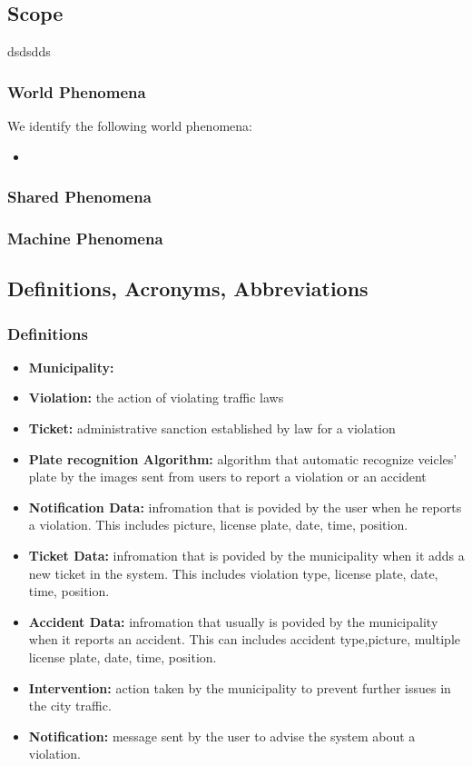 \documentclass {article}
\begin{document}
	\subsection{Scope}
	dsdsdds
	\\		
		\subsubsection{World Phenomena}
		
We identify the following world phenomena:
		\begin{itemize}
			\item		
		\end{itemize}

		\subsubsection{Shared Phenomena}
		
		\subsubsection{Machine Phenomena}


	\subsection{Definitions, Acronyms, Abbreviations}
					
		\subsubsection{Definitions}
			
			\begin{itemize}
				\item {\bf Municipality:} 
				\item {\bf Violation:} the action of violating traffic 					laws
				\item {\bf Ticket:} administrative sanction established 					by law for a violation
				\item {\bf Plate recognition Algorithm:} algorithm that 					automatic recognize veicles' plate by the images sent 						from users to report a violation or an accident 
				\item {\bf Notification Data:} infromation that is 						povided by the user when he reports a violation. This 						includes picture, license plate, date, time, position.
				\item {\bf Ticket Data:} infromation that is povided by 					the municipality when it adds a new ticket in the 							system. This includes violation type, license plate, 						date, time, position.
				\item {\bf Accident Data:} infromation that usually is 					povided by the municipality when it reports an accident. 				This can includes accident type,picture, multiple 							license plate, date, time, position.
				\item {\bf Intervention:} action taken by the 								municipality to prevent further issues in the city 						traffic.
				\item {\bf Notification:} message sent by the user to 						advise the system about a violation.
			\end{itemize}
		
\end{document}
